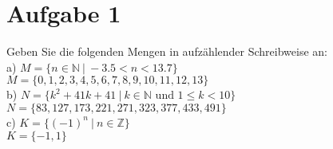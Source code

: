 \section*{Aufgabe 1}

Geben Sie die folgenden Mengen in aufzählender Schreibweise an:\\

a) $M = \{n \in \mathbb{N} \ | \ -3.5 < n < 13.7\}$\\

$M = \{0, 1, 2, 3, 4, 5, 6, 7, 8, 9, 10, 11, 12, 13\}$\\

b) $N = \{k^2 + 41k + 41 \ | \ k \in \mathbb{N} \text{ und } 1 \leq k < 10\}$\\

$N = \{83, 127, 173, 221, 271, 323, 377, 433, 491\}$\\

c) $K = \{(-1)^n \ | \ n \in \mathbb{Z}\}$\\

$K = \{-1, 1\}$

